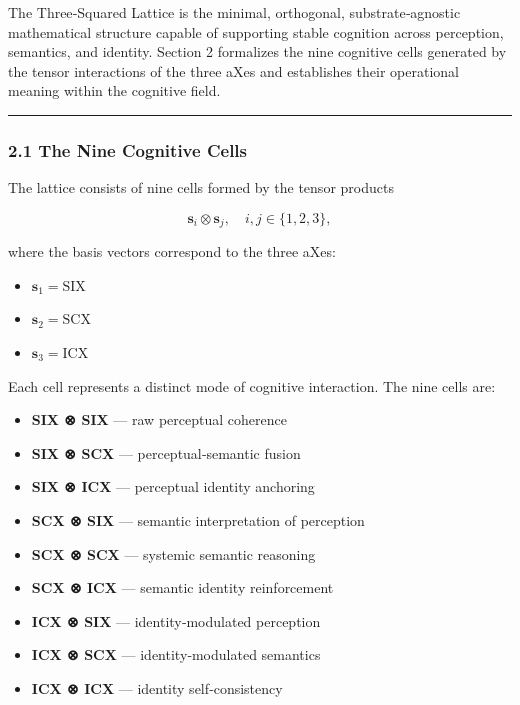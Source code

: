 The Three‑Squared Lattice is the minimal, orthogonal, substrate‑agnostic mathematical structure capable of supporting stable cognition across perception, semantics, and identity. Section 2 formalizes the nine cognitive cells generated by the tensor interactions of the three aXes and establishes their operational meaning within the cognitive field.

\begin{center}\rule{0.5\linewidth}{0.5pt}\end{center}

\subsubsection{2.1 The Nine Cognitive Cells}\label{the-nine-cognitive-cells}

The lattice consists of nine cells formed by the tensor products

\[
\mathbf{s}_i \otimes \mathbf{s}_j,\quad i,j \in \{1,2,3\},
\]

where the basis vectors correspond to the three aXes:

\begin{itemize}
\tightlist
\item
  \(\mathbf{s}_1 = \text{SIX}\)\\
\item
  \(\mathbf{s}_2 = \text{SCX}\)\\
\item
  \(\mathbf{s}_3 = \text{ICX}\)
\end{itemize}

Each cell represents a distinct mode of cognitive interaction. The nine cells are:

\begin{itemize}
\tightlist
\item
  \textbf{SIX ⊗ SIX} --- raw perceptual coherence\\
\item
  \textbf{SIX ⊗ SCX} --- perceptual‑semantic fusion\\
\item
  \textbf{SIX ⊗ ICX} --- perceptual identity anchoring\\
\item
  \textbf{SCX ⊗ SIX} --- semantic interpretation of perception\\
\item
  \textbf{SCX ⊗ SCX} --- systemic semantic reasoning\\
\item
  \textbf{SCX ⊗ ICX} --- semantic identity reinforcement\\
\item
  \textbf{ICX ⊗ SIX} --- identity‑modulated perception\\
\item
  \textbf{ICX ⊗ SCX} --- identity‑modulated semantics\\
\item
  \textbf{ICX ⊗ ICX} --- identity self‑consistency
\end{itemize}

